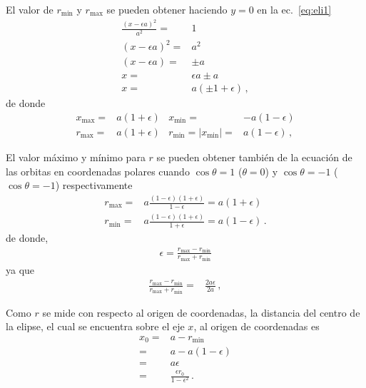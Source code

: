 El valor de $r_{\text{min}}$ y $r_{\text{max}}$ se pueden obtener haciendo $y=0$ en la ec.~\eqref{eq:eli1}
\begin{align}
  \frac{(x-\epsilon a)^2}{a^2}=&1\nonumber\\
  (x-\epsilon a)^2=&a^2\nonumber\\
  (x-\epsilon a)=&\pm a\nonumber\\
  x=&\epsilon a\pm a\nonumber\\
  x=&a(\pm 1+\epsilon)\,,
\end{align}
de donde
\begin{align}
  x_{\text{max}}=&a(1+\epsilon)&x_{\text{min}}=&-a(1-\epsilon)\nonumber\\
  r_{\text{max}}=&a(1+\epsilon)&r_{\text{min}}=|x_{\text{min}}|=&a(1-\epsilon)\,,
\end{align}






\begin{frame}
El valor máximo y mínimo para $r$ se pueden obtener también de la ecuación de las orbitas en coordenadas polares cuando $\cos\theta=1$ ($\theta=0$) y $\cos\theta=-1$ ($\cos\theta=-1$) respectivamente
\begin{align}
  \label{eq:22cent}
  r_{\text{max}}=&a\frac{(1-\epsilon)(1+\epsilon)}{1-\epsilon}=a(1+\epsilon)\nonumber\\
  r_{\text{min}}=&a\frac{(1-\epsilon)(1+\epsilon)}{1+\epsilon}=a(1-\epsilon)\,.
\end{align}
de donde,
\begin{align}
\label{eq:rmaxmin}
  \epsilon=\frac{r_{\text{max}}-r_{\text{min}}}{r_{\text{max}}+r_{\text{min}}}
\end{align}
ya que
\begin{align*}
   \frac{r_{\text{max}}-r_{\text{min}}}{r_{\text{max}}+r_{\text{min}}}=&\frac{2a\epsilon}{2a}\,,
\end{align*}
\end{frame}

Como $r$ se mide con respecto al origen de coordenadas, la distancia del centro de la elipse, el cual se encuentra sobre el eje $x$, al origen de coordenadas es
\begin{align}
\label{eq:15}
  x_0=&a-r_{\text{min}}\nonumber\\
  =&a-a(1-\epsilon)\nonumber\\
  =&a\epsilon\nonumber\\
  =&\frac{\epsilon r_0}{1-\epsilon^2}\,.
\end{align}

